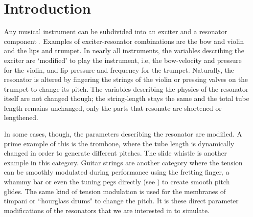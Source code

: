 \section{Introduction}

 Any musical instrument can be subdivided into an exciter and a resonator component \cite{Borin1989}. Examples of exciter-resonator combinations are the bow and violin and the lips and trumpet. In nearly all instruments, the variables describing the exciter are `modified' to play the instrument, i.e, the bow-velocity and pressure for the violin, and lip pressure and frequency for the trumpet. Naturally, the resonator is altered by fingering the strings of the violin or pressing valves on the trumpet to change its pitch. The variables describing the physics of the resonator itself are not changed though; the string-length stays the same and the total tube length remains unchanged, only the parts that resonate are shortened or lengthened.

In some cases, though, the parameters describing the resonator are modified. A prime example of this is the trombone, where the tube length is dynamically changed in order to generate different pitches. The slide whistle is another example in this category. Guitar strings are another category where the tension can be smoothly modulated during performance using the fretting finger, a whammy bar or even the tuning pegs directly (see \cite{Gomm2011}) to create smooth pitch glides. The same kind of tension modulation is used for the membranes of timpani or ``hourglass drums" to change the pitch. %
It is these direct parameter modifications of the resonators that we are interested in to simulate.


